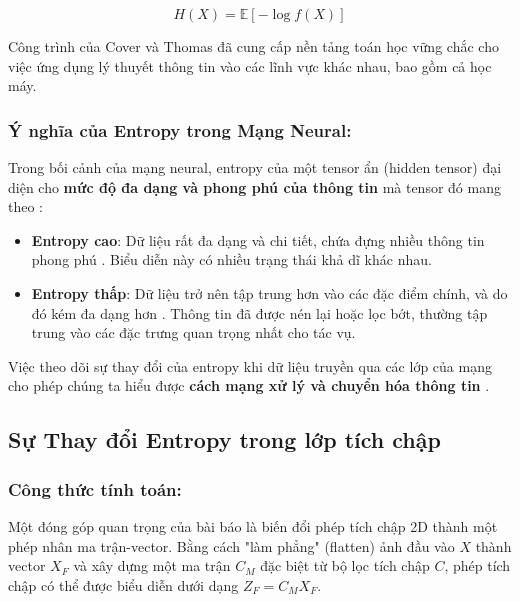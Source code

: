 \begin{equation}
H(X) = \mathbb{E}\left[-\log f(X)\right]
\end{equation}


Công trình của Cover và Thomas \citep{cover2006} đã cung cấp nền tảng toán học vững chắc cho việc ứng dụng lý thuyết thông tin vào các lĩnh vực khác nhau, bao gồm cả học máy.

\subsubsection{Ý nghĩa của Entropy trong Mạng Neural:}

Trong bối cảnh của mạng neural, entropy của một tensor ẩn (hidden tensor) đại diện cho \textbf{mức độ đa dạng và phong phú của thông tin} mà tensor đó mang theo \citep{gabrie2018, meni2023}:

\begin{itemize}
    \item \textbf{Entropy cao}: Dữ liệu rất đa dạng và chi tiết, chứa đựng nhiều thông tin phong phú \citep{principe2000}. Biểu diễn này có nhiều trạng thái khả dĩ khác nhau.
    \item \textbf{Entropy thấp}: Dữ liệu trở nên tập trung hơn vào các đặc điểm chính, và do đó kém đa dạng hơn \citep{tishby1999}. Thông tin đã được nén lại hoặc lọc bớt, thường tập trung vào các đặc trưng quan trọng nhất cho tác vụ.
\end{itemize}

Việc theo dõi sự thay đổi của entropy khi dữ liệu truyền qua các lớp của mạng cho phép chúng ta hiểu được \textbf{cách mạng xử lý và chuyển hóa thông tin} \citep{erdogmus2003}.

\subsection{Sự Thay đổi Entropy trong lớp tích chập}

\subsubsection{Công thức tính toán:}

Một đóng góp quan trọng của bài báo \citep{meni2023} là biến đổi phép tích chập 2D thành một phép nhân ma trận-vector. Bằng cách "làm phẳng" (flatten) ảnh đầu vào \(X\) thành vector \(X_F\) và xây dựng một ma trận \(C_M\) đặc biệt từ bộ lọc tích chập \(C\), phép tích chập có thể được biểu diễn dưới dạng \(Z_F = C_M X_F\).

